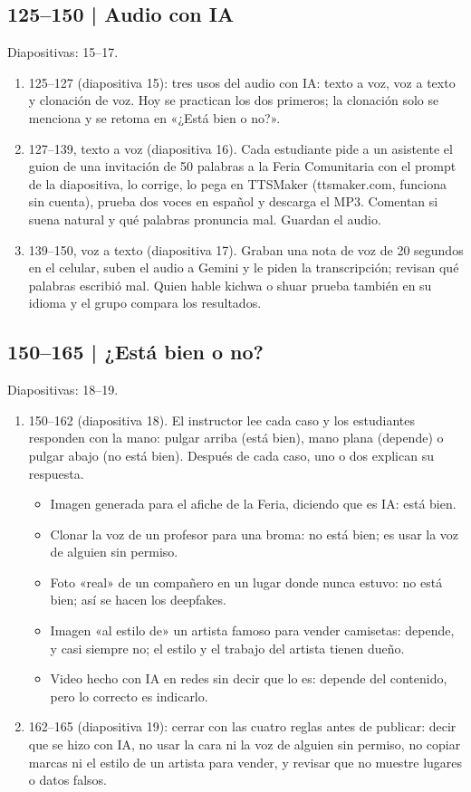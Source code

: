 \documentclass[11pt,a4paper]{article}
\newcommand{\diapos}[1]{\textcolor{gris}{\small\textsf{Diapositivas: #1}}\par}
\begin{document}
\subsection{125--150 | Audio con IA}
\diapos{15--17.}
\begin{enumerate}
\item 125--127 (diapositiva 15): tres usos del audio con IA: texto a voz, voz a texto y clonación de voz. Hoy se practican los dos primeros; la clonación solo se menciona y se retoma en «¿Está bien o no?».
\item 127--139, texto a voz (diapositiva 16). Cada estudiante pide a un asistente el guion de una invitación de 50 palabras a la Feria Comunitaria con el prompt de la diapositiva, lo corrige, lo pega en TTSMaker (ttsmaker.com, funciona sin cuenta), prueba dos voces en español y descarga el MP3. Comentan si suena natural y qué palabras pronuncia mal. Guardan el audio.
\item 139--150, voz a texto (diapositiva 17). Graban una nota de voz de 20 segundos en el celular, suben el audio a Gemini y le piden la transcripción; revisan qué palabras escribió mal. Quien hable kichwa o shuar prueba también en su idioma y el grupo compara los resultados.
\end{enumerate}

\subsection{150--165 | ¿Está bien o no?}
\diapos{18--19.}
\begin{enumerate}
\item 150--162 (diapositiva 18). El instructor lee cada caso y los estudiantes responden con la mano: pulgar arriba (está bien), mano plana (depende) o pulgar abajo (no está bien). Después de cada caso, uno o dos explican su respuesta.
  \begin{itemize}
  \item Imagen generada para el afiche de la Feria, diciendo que es IA: está bien.
  \item Clonar la voz de un profesor para una broma: no está bien; es usar la voz de alguien sin permiso.
  \item Foto «real» de un compañero en un lugar donde nunca estuvo: no está bien; así se hacen los deepfakes.
  \item Imagen «al estilo de» un artista famoso para vender camisetas: depende, y casi siempre no; el estilo y el trabajo del artista tienen dueño.
  \item Video hecho con IA en redes sin decir que lo es: depende del contenido, pero lo correcto es indicarlo.
  \end{itemize}
\item 162--165 (diapositiva 19): cerrar con las cuatro reglas antes de publicar: decir que se hizo con IA, no usar la cara ni la voz de alguien sin permiso, no copiar marcas ni el estilo de un artista para vender, y revisar que no muestre lugares o datos falsos.
\end{enumerate}
\end{document}
